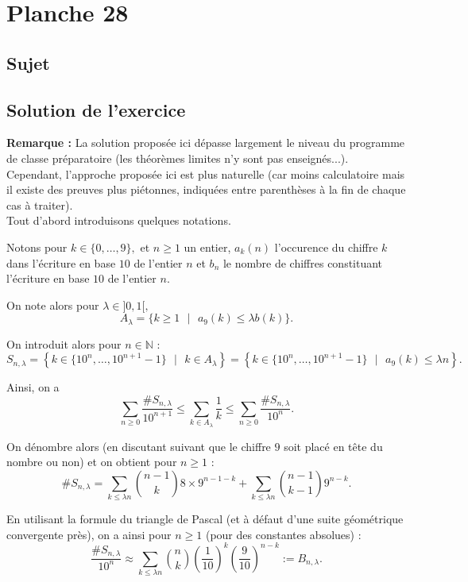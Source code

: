 \chapter{Planche 28}

\section{Sujet}

\section{Solution de l'exercice}

\textbf{Remarque : } La solution proposée ici dépasse largement le niveau du programme de classe préparatoire (les théorèmes limites n'y sont pas enseignés...). Cependant, l'approche proposée ici est plus naturelle (car moins calculatoire mais il existe des preuves plus piétonnes, indiquées entre parenthèses à la fin de chaque cas  à traiter).\\

Tout d'abord introduisons quelques notations.

Notons pour $k\in\{0,\ldots,9\},$ et $n\geq 1$ un entier, $\displaystyle a_{k}(n)$ l'occurence du chiffre $k$ dans l'écriture en base $10$ de l'entier $n$ et $b_{n}$ le nombre de chiffres constituant l'écriture en base $10$  de l'entier $n.$

On note alors pour $\lambda\in]0,1[,$ $$ A_{\lambda}=\{k\geq 1\mbox{ }|\mbox{ }a_{9}(k)\leq \lambda b(k)\}.$$

On introduit alors pour $n\in \mathbb{N}$ : $$ S_{n,\lambda}=\left\{ k\in\{10^{n},\ldots,10^{n+1}-1\}\mbox{ }|\mbox{ } k\in A_{\lambda} \right\}=\left\{ k\in\{10^{n},\ldots,10^{n+1}-1\}\mbox{ }|\mbox{ } a_{9}(k)\leq \lambda n\right\}.$$

Ainsi, on a $$ \sum_{n\geq 0}\frac{\# S_{n,\lambda}}{10^{n+1}}\leq \sum_{k\in A_{\lambda}}\frac{1}{k}\leq \sum_{n\geq 0}\frac{\# S_{n,\lambda}}{10^{n}}.$$

On dénombre alors (en discutant suivant que le chiffre $9$ soit placé en tête du nombre ou non) et on obtient pour $n\geq 1$  : $$\# S_{n,\lambda}=\sum_{k\leq \lambda n}\binom{n-1}{k}8\times 9^{n-1-k} + \sum_{k\leq \lambda n}\binom{n-1}{k-1}9^{n-k}.$$

En utilisant la formule du triangle de Pascal (et à défaut d'une suite géométrique convergente près), on a ainsi pour $n\geq 1$ (pour des constantes absolues) : $$ \frac{\# S_{n,\lambda}}{10^{n}}\approx \sum_{k\leq \lambda n}\binom{n}{k}(\frac{1}{10})^{k}(\frac{9}{10})^{n-k}:=B_{n,\lambda}.$$

